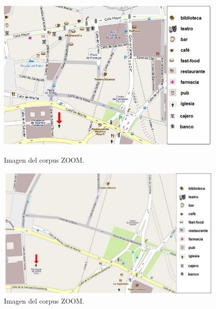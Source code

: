 \begin{figure}
\begin{minipage}[b]{0.48\linewidth}
\centering
\includegraphics[width=\textwidth]{images/corpus/mapa6.png}
\caption{Imagen del corpus ZOOM.}
\label{mapa15}
\end{minipage}
\hspace*{0cm}
\begin{minipage}[b]{0.55\linewidth}
\centering
\includegraphics[width=\textwidth]{images/corpus/mapa16.png}
\caption{Imagen del corpus ZOOM.}
\label{mapa16}
\end{minipage}
\end{figure}


